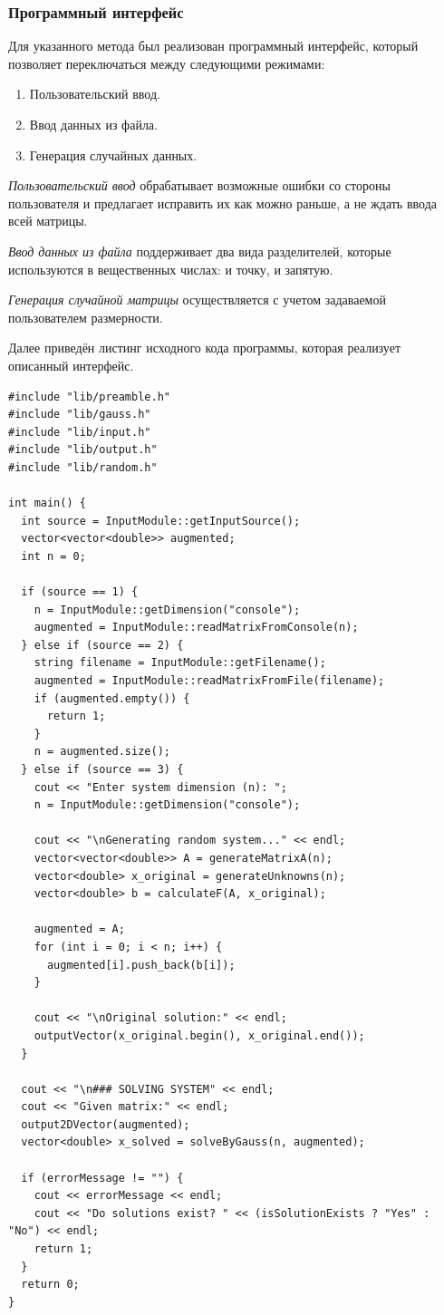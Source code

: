 \subsubsection{Программный интерфейс}

Для указанного метода был реализован программный интерфейс, который позволяет переключаться между следующими режимами:
\begin{enumerate}
  \item Пользовательский ввод.
  \item Ввод данных из файла.
  \item Генерация случайных данных.
\end{enumerate}

\textit{Пользовательский ввод} обрабатывает возможные ошибки со стороны пользователя и предлагает исправить их как можно раньше, а не ждать ввода всей матрицы.

\textit{Ввод данных из файла} поддерживает два вида разделителей, которые используются в вещественных числах: и точку, и запятую.

\textit{Генерация случайной матрицы} осуществляется с учетом задаваемой пользователем размерности.

Далее приведён листинг исходного кода программы, которая реализует описанный интерфейс.

\begin{lstlisting}[caption=Файл \texttt{main.cpp}]
#include "lib/preamble.h"
#include "lib/gauss.h"
#include "lib/input.h"
#include "lib/output.h"
#include "lib/random.h"

int main() {
  int source = InputModule::getInputSource();
  vector<vector<double>> augmented;
  int n = 0;

  if (source == 1) {
    n = InputModule::getDimension("console");
    augmented = InputModule::readMatrixFromConsole(n);
  } else if (source == 2) {
    string filename = InputModule::getFilename();
    augmented = InputModule::readMatrixFromFile(filename);
    if (augmented.empty()) {
      return 1;
    }
    n = augmented.size();
  } else if (source == 3) {
    cout << "Enter system dimension (n): ";
    n = InputModule::getDimension("console");

    cout << "\nGenerating random system..." << endl;
    vector<vector<double>> A = generateMatrixA(n);
    vector<double> x_original = generateUnknowns(n);
    vector<double> b = calculateF(A, x_original);

    augmented = A;
    for (int i = 0; i < n; i++) {
      augmented[i].push_back(b[i]);
    }

    cout << "\nOriginal solution:" << endl;
    outputVector(x_original.begin(), x_original.end());
  }

  cout << "\n### SOLVING SYSTEM" << endl;
  cout << "Given matrix:" << endl;
  output2DVector(augmented);
  vector<double> x_solved = solveByGauss(n, augmented);

  if (errorMessage != "") {
    cout << errorMessage << endl;
    cout << "Do solutions exist? " << (isSolutionExists ? "Yes" : "No") << endl;
    return 1;
  }
  return 0;
}
\end{lstlisting}

